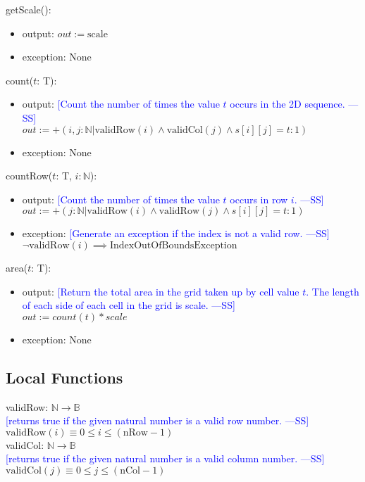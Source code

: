 \documentclass[12pt]{article}
\newcommand{\authornote}[3]{\textcolor{#1}{[#3 ---#2]}}
\newcommand{\authornote}[3]{}
\newcommand{\wss}[1]{\authornote{blue}{SS}{#1}}
\begin{document}
\noindent getScale():
\begin{itemize}
\item output: $out := \mbox{scale}$
\item exception: None
\end{itemize}

\noindent count($t$: T):
\begin{itemize}
\item output: \wss{Count the number of times the value $t$ occurs in the 2D sequence.}\\
$out := +(i,j : \mathbb{N} | \mbox{validRow}(i) \land \mbox{validCol}(j) \land s[i][j] = t : 1) $
\item exception: None
\end{itemize}

\noindent countRow($t$: T, $i: \mathbb{N}$):
\begin{itemize}
\item output: \wss{Count the number of times the value $t$ occurs in row $i$.}\\
$out := +(j : \mathbb{N} | \mbox{validRow}(i) \land \mbox{validRow}(j) \land s[i][j] = t : 1)  $ 
\item exception: \wss{Generate an exception if the index is not a valid row.}\\
$\lnot \mbox{validRow}(i) \implies \mbox{IndexOutOfBoundsException}$
\end{itemize}

\noindent area($t$: T):
\begin{itemize}
\item output: \wss{Return the total area in the grid taken up by cell value $t$.
    The length of each side of each cell in the grid is
    scale.}\\
$out := count(t) * scale$
\item exception: None
\end{itemize}

\subsection*{Local Functions}

\noindent validRow: $\mathbb{N} \rightarrow \mathbb{B}$\\
\noindent \wss{returns true if the given natural number is a valid row number.}\\ 
$\mbox{validRow}(i) \equiv 0 \le i \le (\mbox{nRow} - 1)$ \\

\noindent validCol: $\mathbb{N} \rightarrow \mathbb{B}$\\
\noindent \wss{returns true if the given natural number is a valid column
  number.}\\
$\mbox{validCol}(j) \equiv 0 \le j \le (\mbox{nCol} - 1)$ \\
\end{document}
